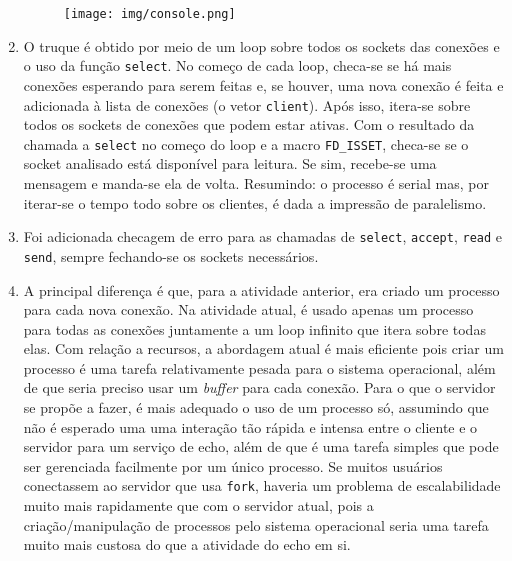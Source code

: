 \documentclass[11pt]{article}
\newcommand{\tit}[1]{\textit{#1}}
\newcommand{\ttt}[1]{\texttt{#1}}
\begin{document}
\begin{enumerate}
		\begin{figure}[H]
			\centering
			\texttt{[image: img/console.png]}
		\end{figure}

	\item O truque é obtido por meio de um loop sobre todos os sockets das
		conexões e o uso da função \ttt{select}. No começo de cada loop,
		checa-se se há mais conexões esperando para serem feitas e, se houver,
		uma nova conexão é feita e adicionada à lista de conexões (o vetor
		\ttt{client}). Após isso, itera-se sobre todos os sockets de conexões
		que podem estar ativas. Com o resultado da chamada a \ttt{select} no
		começo do loop e a macro \ttt{FD\_ISSET}, checa-se se o socket analisado
		está disponível para leitura. Se sim, recebe-se uma mensagem e manda-se
		ela de volta. Resumindo: o processo é serial mas, por iterar-se o tempo
		todo sobre os clientes, é dada a impressão de paralelismo.

	\item Foi adicionada checagem de erro para as chamadas de \ttt{select},
		\ttt{accept}, \ttt{read} e \ttt{send}, sempre fechando-se os sockets
		necessários.

	\item A principal diferença é que, para a atividade anterior, era criado
		um processo para cada nova conexão. Na atividade atual, é usado apenas
		um processo para todas as conexões juntamente a um loop infinito que 
		itera sobre todas elas. Com relação a recursos, a abordagem atual
		é mais eficiente pois criar um processo é uma tarefa relativamente
		pesada para o sistema operacional, além de que seria preciso usar um
		\tit{buffer} para cada conexão. Para o que o servidor se propõe a fazer,
		é mais adequado o uso de um processo só, assumindo que não é esperado 
		uma uma interação tão rápida e intensa entre o cliente e o servidor para
		um serviço de echo, além de que é uma tarefa simples que pode ser
		gerenciada facilmente por um único processo. 
		Se muitos usuários conectassem ao servidor que usa \ttt{fork}, haveria
		um problema de escalabilidade muito mais rapidamente que com o servidor
		atual, pois a criação/manipulação de processos pelo sistema operacional
		seria uma tarefa muito mais custosa do que a atividade do echo em si.

\end{enumerate}
\end{document}
